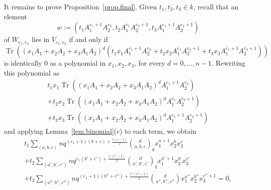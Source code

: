 \documentclass[12pt]{amsart}
\numberwithin{equation}{section}
\numberwithin{subsection}{section}
\theoremstyle{definition} \newtheorem{definition}[theorem]{Definition}
\newcommand{\tr}{\operatorname{Tr}}
\begin{document}
It remains to prove Proposition~\ref{prop.final}.
Given $t_1, t_2, t_3 \in k$, recall that an element 
\[ w := (t_1 A_1^{e_1 + 1} A_2^{e_2}, 
t_2 A_1^{e_1} A_2^{e_2 + 1}, t_3 A_1^{e_1 + 1} A_2^{e_2 + 1}) \] 
of $W_{e_1, e_2}$ lies in $V_{e_1, e_2}$ if and only if
\[ \tr((x_1 A_1 + x_2 A_2 + x_3 A_1 A_2)^d(t_1 x_1 A_1^{e_1+1} A_2^{e_2} +
t_2 x_2 A_1^{e_1} A_2^{e_2 + 1} + t_3 x_3 A_1^{e_1+1} A_2^{e_2+ 1})) \]  
is identically $0$
as a polynomial in $x_1, x_2, x_3$, for every $d = 0, \dots, n-1$.
Rewriting this polynomial as 
\begin{gather} \nonumber
t_1 x_1 \tr((x_1 A_1 + x_2 A_2 + x_3 A_1 A_2)^d 
A_1^{e_1+1} A_2^{e_2})  \\ 
\nonumber
+ t_2 x_2 \tr( (x_1 A_1 + x_2 A_2 +  x_3 A_1 A_2)^d A_1^{e_1} A_2^{e_2 + 1}) \\ 
\nonumber
+ t_3 x_3 \tr( (x_1 A_1 + x_2 A_2 +  x_3 A_1 A_2)^d A_1^{e_1 + 1} 
A_2^{e_2 + 1}) 
\end{gather}
and applying Lemma~\ref{lem.binomial}(c) to each term, we obtain
\begin{gather} \nonumber t_1 \sum_{(a, b, c)}
n q^{(e_1+1)(b+c) + \frac{c(c-1)}{2}} 
\binom{d}{a, b, c}_q x_1^{a + 1} x_2^b x_3^c \\ 
\label{e.expansion}
+ t_2 \sum_{(a', b', c')}
n q^{e_1(b'+c') + \frac{c'(c'-1)}{2}} 
\binom{d}{a', b', c'}_q 
x_1^{a' + 1} x_2^{b'} x_3^{c'} \\ 
\nonumber
+ t_3 \sum_{(a'', b'', c'')} 
n q^{(e_1+ 1)(b''+c'') + \frac{c''(c''-1)}{2}} 
\binom{d}{a'', b'', c''} x_1^{a''} x_2^{b''} x_3^{c'' + 1} = 0,
\end{gather}
\end{document}
